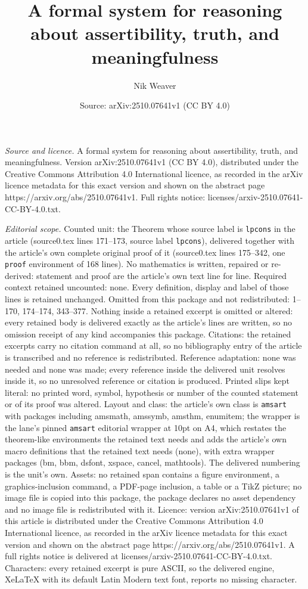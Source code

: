 \documentclass[10pt,a4paper]{amsart}
\title[A formal system for reasoning about assertibility, truth, an]{A formal system for reasoning about assertibility, truth, and meaningfulness}
\author{Nik Weaver}
\date{Source: arXiv:2510.07641v1 (CC BY 4.0)}
\begin{document}
\maketitle

\noindent\emph{Source and licence.} A formal system for reasoning about assertibility, truth, and meaningfulness. Version arXiv:2510.07641v1 (CC BY 4.0), distributed under the Creative Commons Attribution 4.0 International licence, as recorded in the arXiv licence metadata for this exact version and shown on the abstract page https://arxiv.org/abs/2510.07641v1. Full rights notice: licenses/arxiv-2510.07641-CC-BY-4.0.txt.\par\smallskip

\noindent\textit{Editorial scope.} Counted unit: the Theorem whose source label is \texttt{lpcons} in the article (source0.tex lines 171--173, source label \texttt{lpcons}), delivered together with the article's own complete original proof of it (source0.tex lines 175--342, one \texttt{proof} environment of 168 lines). No mathematics is written, repaired or re-derived: statement and proof are the article's own text line for line. Required context retained uncounted: none. Every definition, display and label of those lines is retained unchanged. Omitted from this package and not redistributed: 1--170, 174--174, 343--377. Nothing inside a retained excerpt is omitted or altered: every retained body is delivered exactly as the article's lines are written, so no omission receipt of any kind accompanies this package. Citations: the retained excerpts carry no citation command at all, so no bibliography entry of the article is transcribed and no reference is redistributed. Reference adaptation: none was needed and none was made; every reference inside the delivered unit resolves inside it, so no unresolved reference or citation is produced. Printed slips kept literal: no printed word, symbol, hypothesis or number of the counted statement or of its proof was altered. Layout and class: the article's own class is \texttt{amsart} with packages including amsmath, amssymb, amsthm, enumitem; the wrapper is the lane's pinned \texttt{amsart} editorial wrapper at 10pt on A4, which restates the theorem-like environments the retained text needs and adds the article's own macro definitions that the retained text needs (none), with extra wrapper packages (bm, bbm, dsfont, xspace, cancel, mathtools). The delivered numbering is the unit's own. Assets: no retained span contains a figure environment, a graphics-inclusion command, a PDF-page inclusion, a table or a TikZ picture; no image file is copied into this package, the package declares no asset dependency and no image file is redistributed with it. Licence: version arXiv:2510.07641v1 of this article is distributed under the Creative Commons Attribution 4.0 International licence, as recorded in the arXiv licence metadata for this exact version and shown on the abstract page https://arxiv.org/abs/2510.07641v1. A full rights notice is delivered at licenses/arxiv-2510.07641-CC-BY-4.0.txt. Characters: every retained excerpt is pure ASCII, so the delivered engine, XeLaTeX with its default Latin Modern text font, reports no missing character.
\end{document}
